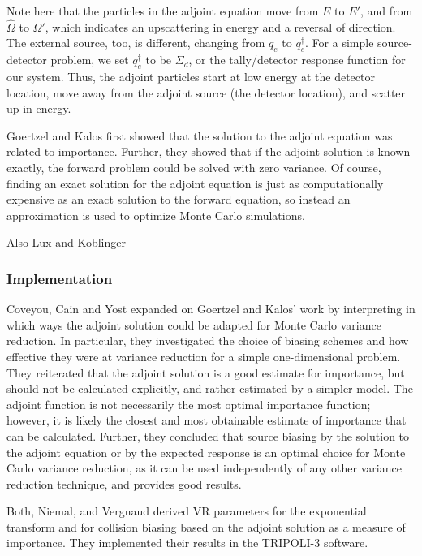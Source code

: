 Note here that the particles in the adjoint equation move from $E$ to $E'$, and
from $\hat\Omega$ to $\hat\Omega'$, which indicates an upscattering in energy
and a reversal of direction. The external source, too, is different, changing
from $q_{e}$ to $q_{e}^\dagger$. For a simple source-detector problem, we set
$q_{e}^\dagger$ to be $\Sigma _{ d }$, or the tally/detector response function
for our system. Thus, the adjoint particles start at low energy at the detector
location, move away from the adjoint source (the detector location), and scatter
up in energy.

Goertzel \cite{goertzel_monte_1958} and Kalos \cite{kalos_importance_1963} first
showed that the solution to the adjoint equation was related to importance.
Further, they showed that if the adjoint solution is known exactly, the forward
problem could be solved with zero variance. Of course, finding an exact solution
for the adjoint equation is just as computationally expensive as an exact
solution to the forward equation, so instead an approximation is used to
optimize Monte Carlo simulations.

Also Lux and Koblinger \cite{lux_monte_1991}

\subsubsection{Implementation}

Coveyou, Cain and Yost \cite{coveyou_adjoint_1967} expanded on Goertzel and
Kalos' work by interpreting in which ways the adjoint solution could be adapted
for Monte Carlo variance reduction. In particular, they investigated the choice
of biasing schemes and how effective they were at variance reduction for a
simple one-dimensional problem. They reiterated that the adjoint solution is a
good estimate for importance, but should not be calculated explicitly, and
rather estimated by a simpler model. The adjoint function is not necessarily the
most optimal importance function; however, it is likely the closest and most
obtainable estimate of importance that can be calculated. Further, they
concluded that source biasing by the solution to the adjoint equation or by the
expected response is an optimal choice for Monte Carlo variance reduction, as it
can be used independently of any other variance reduction technique, and
provides good results.

Both, Niemal, and Vergnaud \cite{both_automated_1990} derived VR parameters for
the exponential transform and for collision biasing based on the adjoint
solution as a measure of importance. They implemented their results in the
TRIPOLI-3 software.

